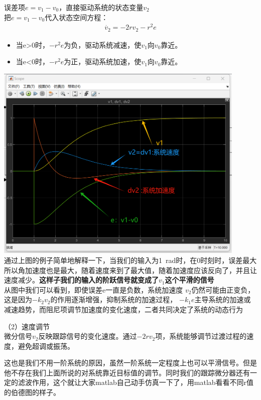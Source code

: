 \documentclass[UTF8,a4paper,12pt]{ctexart}
\begin{document}
              误差项$e=v_1-v_0$，直接驱动系统的状态变量$v_2$\\
              把$e=v_1-v_0$代入状态空间方程：
              \begin{align*}
                \overset{\cdot}{v}_2=-2rv_2-r^2e
              \end{align*}
              \begin{itemize} 
                \item 当e>0时，$-r^2e$为负，驱动系统减速，使$v_1$向$v_0$靠近。
                \item 当e<0时，$-r^2e$为正，驱动系统加速，使$v_1$向$v_0$靠近。
              \end{itemize}
              \par \includegraphics[width=12cm]{picture/tracking_differentiator_scope.png}\\
              通过上图的例子简单地解释一下，当我们的输入为1\ rad时，在0时刻时，误差最大所以角加速度也是最大，随着速度来到了最大值，随着加速度应该反向了，并且让速度减少。\textbf{这样子我们的输入的阶跃信号就变成了$v_1$这个平滑的信号}\\
              从图中我们可以看到，即使误差e一直是负数，系统加速度 $v_2$仍然可能由正变负，这是因为$-k_2v_2$的作用逐渐增强，抑制系统的加速过程， $-k_1e$主导系统的加速或减速趋势，而阻尼项调节加速度的变化速度，二者共同决定了系统的动态行为\\
              \begin{flushleft}
                （2）速度调节\\
              微分信号$v_2$反映跟踪信号的变化速度。通过$-2rv_2$项，系统能够调节过渡过程的速度，避免超调或振荡。\\
              \begin{flushleft}
                这也是我们不用一阶系统的原因，虽然一阶系统一定程度上也可以平滑信号。但是他不存在我们上面所说的对系统靠近目标值的调节。同时我们的跟踪微分器还有一定的滤波作用，这个就让大家matlab自己动手仿真一下了，用matlab看看不同r值的伯德图的样子。

              \end{flushleft}
              \end{flushleft}
              
\end{document}
